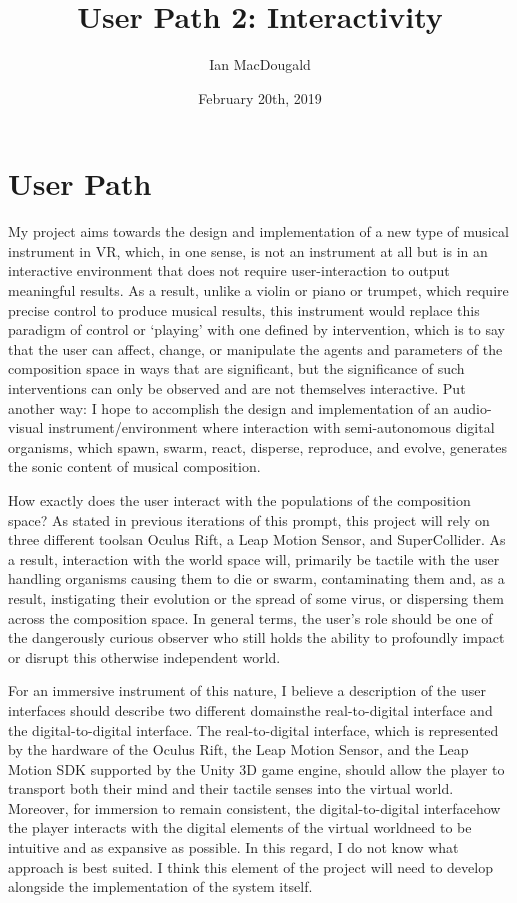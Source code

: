 \documentclass[12pt]{article}
\title{User Path 2: Interactivity}
\author{Ian MacDougald}
\date{February 20th, 2019}
\begin{document}
	\setlength{\droptitle}{-10em}
	\maketitle
	\onehalfspacing
	\section*{User Path}
	
	My project aims towards the design and implementation of a new type of musical instrument in VR, which, in one sense, is not an instrument at all but is in an interactive environment that does not require user-interaction to output meaningful results. As a result, unlike a violin or piano or trumpet, which require precise control to produce musical results, this instrument would replace this paradigm of control or `playing' with one defined by intervention, which is to say that the user can affect, change, or manipulate the agents and parameters of the composition space in ways that are significant, but the significance of such interventions can only be observed and are not themselves interactive. Put another way: I hope to accomplish the design and implementation of an audio-visual instrument/environment where interaction with semi-autonomous digital organisms, which spawn, swarm, react, disperse, reproduce, and evolve, generates the sonic content of musical composition. 
	
	How exactly does the user interact with the populations of the composition space? As stated in previous iterations of this prompt, this project will rely on three different tools\textemdash an Oculus Rift, a Leap Motion Sensor, and SuperCollider. As a result, interaction with the world space will, primarily be tactile with the user handling organisms causing them to die or swarm, contaminating them and, as a result, instigating their evolution or the spread of some virus, or dispersing them across the composition space. In general terms, the user's role should be one of the dangerously curious observer who still holds the ability to profoundly impact or disrupt this otherwise independent world. 
	
	For an immersive instrument of this nature, I believe a description of the user interfaces should describe two different domains\textemdash the real-to-digital interface and the digital-to-digital interface. The real-to-digital interface, which is represented by the hardware of the Oculus Rift, the Leap Motion Sensor, and the Leap Motion SDK supported by the Unity 3D game engine, should allow the player to transport both their mind and their tactile senses into the virtual world. Moreover, for immersion to remain consistent, the digital-to-digital interface\textemdash how the player interacts with the digital elements of the virtual world\textemdash need to be intuitive and as expansive as possible. In this regard, I do not know what approach is best suited. I think this element of the project will need to develop alongside the implementation of the system itself. 
\end{document}
